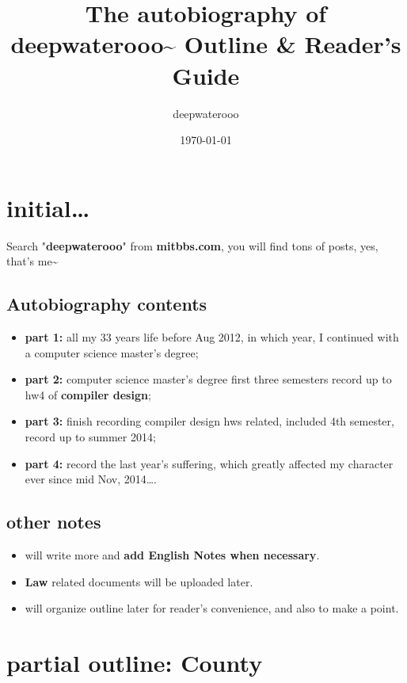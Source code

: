 \documentclass[9pt,b5paper]{article}
\author{deepwaterooo}
\date{\today}
\title{The autobiography of deepwaterooo\textasciitilde{} \linebreak Outline \& Reader's Guide}
\begin{document}
\maketitle
\tableofcontents


\section{initial\ldots{}}
\label{sec-1}
Search "\textbf{deepwaterooo}" from \textbf{mitbbs.com}, you will find tons of posts, yes, that's me\textasciitilde{}
\subsection{Autobiography contents}
\label{sec-1-1}
\begin{itemize}
\item \textbf{part 1:} all my 33 years life before Aug 2012, in which year, I continued with a computer science master's degree;
\item \textbf{part 2:} computer science master's degree first three semesters record up to hw4 of \textbf{compiler design};
\item \textbf{part 3:} finish recording compiler design hws related, included 4th semester, record up to summer 2014;
\item \textbf{part 4:} record the last year's suffering, which greatly affected my character ever since mid Nov, 2014\ldots{}.
\end{itemize}
\subsection{other notes}
\label{sec-1-2}
\begin{itemize}
\item will write more and \textbf{add English Notes when necessary}.
\item \textbf{Law} related documents will be uploaded later.
\item will organize outline later for reader's convenience, and also to make a point.
\end{itemize}

\section{partial outline: County}
\label{sec-2}
\end{document}
